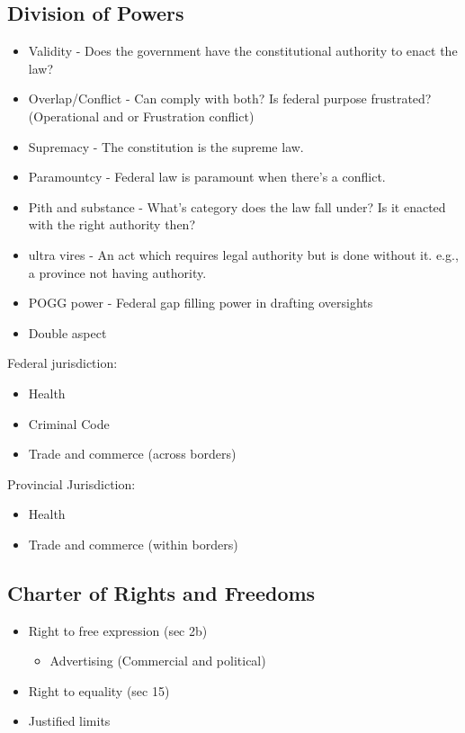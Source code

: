 \documentclass[
  letterpaper,
  landscape,
  columns=3,
  draft,
]{cheatsheet}
\begin{document}
  \subsection{Division of Powers}
  \begin{itemize}
    \item Validity - Does the government have the constitutional authority to enact the law?
    \item Overlap/Conflict - Can comply with both? Is federal purpose frustrated? (Operational and or Frustration conflict)
    \item Supremacy - The constitution is the supreme law.
    \item Paramountcy - Federal law is paramount when there's a conflict.
    \item Pith and substance - What's category does the law fall under? Is it enacted with the right authority then?
    \item ultra vires - An act which requires legal authority but is done without it. e.g., a province not having authority.
    \item POGG power - Federal gap filling power in drafting oversights
    \item Double aspect
  \end{itemize}
  Federal jurisdiction:
  \begin{itemize}
    \item Health
    \item Criminal Code
    \item Trade and commerce (across borders)
  \end{itemize}
  Provincial Jurisdiction:
  \begin{itemize}
    \item Health
    \item Trade and commerce (within borders)
  \end{itemize}
  \subsection{Charter of Rights and Freedoms}
  \begin{itemize}
    \item Right to free expression (sec 2b)
          \begin{itemize}
            \item Advertising (Commercial and political)
          \end{itemize}
    \item Right to equality (sec 15)
    \item Justified limits
  \end{itemize}
\end{document}
